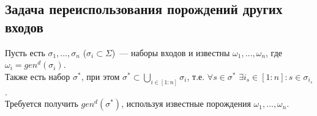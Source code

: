 \subsection{Задача переиспользования порождений других входов}

Пусть есть $\sigma_1, \dots, \sigma_n$ ($\sigma_i \subset \Sigma$)~--- наборы входов и известны $\omega_1, \dots, \omega_n$, где $\omega_i = gen^d(\sigma_i)$.\\
Также есть набор $\sigma^*$, при этом $\sigma^* \subset \bigcup\limits_{i \in [1:n]}\sigma_i$, т.е. $\forall s \in \sigma^*$ $\exists i_s \in [1:n]: s \in \sigma_{i_s}$.\\
Требуется получить $gen^d(\sigma^*)$, используя известные порождения $\omega_1, \dots, \omega_n$.
